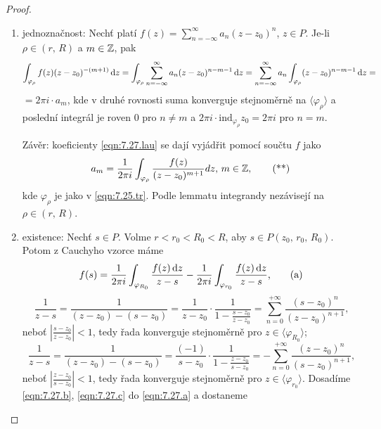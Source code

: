 \begin{proof}

\begin{enumerate}
 \item jednoznačnost: Nechť platí $f(z)=\sum\limits_{n=-\infty}^\infty a_n(z-z_0)^n$, $z \in P$. Je-li $\rho \in (r,\,R)$ a $m \in \operatorname{\mathbb{Z}} $, pak 
$$
\int_{\varphi_\rho}f(z)(z-z_0)^{-(m+1)} \mathop{}\!\mathrm{d} z = \int_{\varphi_\rho} \sum\limits_{n=-\infty}^{\infty} a_n(z-z_0)^{n-m-1} \mathop{}\!\mathrm{d} z = \sum\limits_{n=-\infty}^{\infty} a_n \int_{\varphi_\rho}(z-z_0)^{n-m-1} \mathop{}\!\mathrm{d} z = 
$$
$=2\pi i \cdot a_m$, kde v druhé rovnosti suma konverguje stejnoměrně na $\langle\varphi_\rho \rangle$ a poslední integrál je roven $0$ pro $n \neq m$ a $2\pi i \cdot \text{ind}_{\varphi_\rho}z_0=2\pi i$ pro $n=m$.

Závěr: koeficienty \cref{eqn:7.27.lau} se dají vyjádřit pomocí součtu $f$ jako 
\begin{equation}
    a_m=\frac{1}{2 \pi i}\int_{\varphi_\rho}\frac{f(z)}{(z-z_0)^{m+1}} dz\text{, } m \in \operatorname{\mathbb{Z}} , 
    \tag{**}
    \label{eqn:7.27.**}
\end{equation}
kde $\varphi_\rho$ je jako v \cref{eqn:7.25.tr}. Podle lemmatu integrandy nezávisejí na $\rho \in (r,\,R)$.
\item existence: Nechť $s \in P$. Volme $r<r_0<R_0<R$, aby $s \in P(z_0,\,r_0,\,R_0)$. Potom z Cauchyho vzorce máme \begin{equation}
    f(s)=\frac{1}{2 \pi i}\int_{\varphi_{R_0}}\frac{f(z) \mathop{}\!\mathrm{d} z}{z-s}-\frac{1}{2 \pi i}\int_{\varphi_{r_0}}\frac{f(z) \mathop{}\!\mathrm{d} z}{z-s}\text{,}
    \tag{a}
    \label{eqn:7.27.a}
\end{equation}
\begin{equation}
    \frac{1}{z-s}=\frac{1}{(z-z_0)-(s-z_0)}=\frac{1}{z-z_0}\cdot \frac{1}{1-\frac{s-z_0}{z-z_0}}=\sum\limits_{n=0}^{+\infty}\frac{(s-z_0)^n}{(z-z_0)^{n+1}}\text{,}
    \tag{b}
    \label{eqn:7.27.b}
\end{equation}
neboť $\left|\frac{s-z_0}{z-z_0}\right|<1$, tedy řada konverguje stejnoměrně pro $z \in \langle\varphi_{R_0} \rangle$;
\begin{equation}
    \frac{1}{z-s}=\frac{1}{(z-z_0)-(s-z_0)}=\frac{(-1)}{s-z_0}\cdot \frac{1}{1-\frac{z-z_0}{s-z_0}}=-\sum\limits_{n=0}^{+\infty}\frac{(z-z_0)^n}{(s-z_0)^{n+1}}\text{,}
    \tag{c}
    \label{eqn:7.27.c}   
\end{equation}
neboť $\left|\frac{z-z_0}{s-z_0}\right|<1$, tedy řada konverguje stejnoměrně pro $z \in \langle\varphi_{r_0} \rangle$.
Dosadíme \cref{eqn:7.27.b}, \cref{eqn:7.27.c} do \cref{eqn:7.27.a} a dostaneme

\end{enumerate}
\end{proof}
